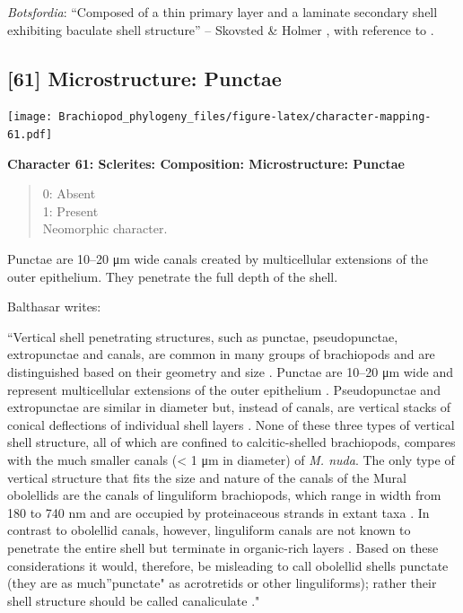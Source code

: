 \documentclass[openany]{book}
\theoremstyle{definition}
\theoremstyle{definition}
\theoremstyle{definition}
\theoremstyle{remark}
\begin{document}
\emph{Botsfordia}: ``Composed of a thin primary layer and a laminate
secondary shell exhibiting baculate shell structure'' -- Skovsted \&
Holmer \citeyearpar{Skovsted2005EarlyCambrian}, with reference to
\citet{Skovsted2003EarlyCambrian}.

\hypertarget{microstructure-punctae}{%
\subsection*{{[}61{]} Microstructure:
Punctae}\label{microstructure-punctae}}

\texttt{[image: Brachiopod\_phylogeny\_files/figure-latex/character-mapping-61.pdf]}

\textbf{Character 61: Sclerites: Composition: Microstructure: Punctae}

\begin{quote}
0: Absent\\
1: Present\\
Neomorphic character.
\end{quote}

Punctae are 10--20 μm wide canals created by multicellular extensions of
the outer epithelium. They penetrate the full depth of the shell.

Balthasar \citeyearpar{Balthasar2008iMummpikia} writes:

``Vertical shell penetrating structures, such as punctae, pseudopunctae,
extropunctae and canals, are common in many groups of brachiopods and
are distinguished based on their geometry and size
\citep{Williams1997BrachiopodaRevised}. Punctae are 10--20 μm wide and
represent multicellular extensions of the outer epithelium
\citep{Owen1969Thecaecum}. Pseudopunctae and extropunctae are similar in
diameter but, instead of canals, are vertical stacks of conical
deflections of individual shell layers \citep{Williams1993Roleof}. None
of these three types of vertical shell structure, all of which are
confined to calcitic-shelled brachiopods, compares with the much smaller
canals (\textless{} 1 μm in diameter) of \emph{M. nuda}. The only type
of vertical structure that fits the size and nature of the canals of the
Mural obolellids are the canals of linguliform brachiopods, which range
in width from 180 to 740 nm and are occupied by proteinaceous strands in
extant taxa
\citep{Williams1992Structureof, Williams1994Collagenouschitino, Williams1997BrachiopodaRevised}.
In contrast to obolellid canals, however, linguliform canals are not
known to penetrate the entire shell but terminate in organic-rich layers
\citep{Williams1997BrachiopodaRevised}. Based on these considerations it
would, therefore, be misleading to call obolellid shells punctate (they
are as much''punctate" as acrotretids or other linguliforms); rather
their shell structure should be called canaliculate
\citep{Williams1997BrachiopodaRevised}."
\end{document}
